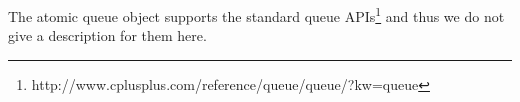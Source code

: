 %
%

The atomic queue object supports the standard queue APIs\footnote{http://www.cplusplus.com/reference/queue/queue/?kw=queue} and thus we do not give a description for them here.

